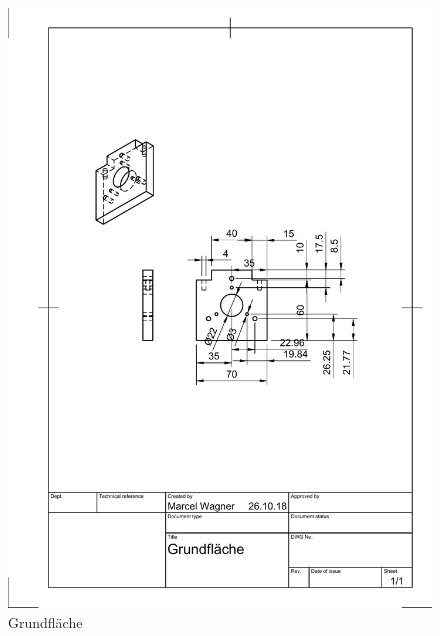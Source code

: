 \begin{figure}
	\includegraphics[width=\textwidth]{images/Mechanik/Grundflaeche}
	\caption{Grundfläche}
\end{figure}

